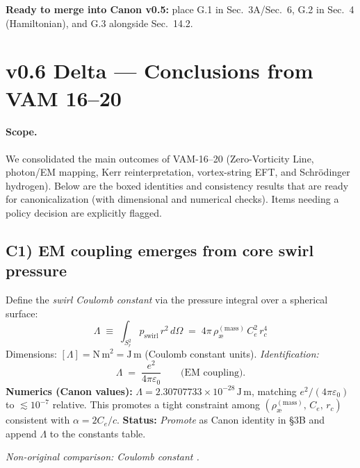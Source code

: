 \documentclass[11pt]{article}
\begin{document}
\textbf{Ready to merge into Canon v0.5:} place G.1 in Sec.~3A/Sec.~6, G.2 in Sec.~4 (Hamiltonian), and G.3 alongside Sec.~14.2.


    \section*{v0.6 Delta — Conclusions from VAM 16–20}
    \label{sec:v06-delta}

    \paragraph{Scope.}
    We consolidated the main outcomes of VAM-16–20 (Zero-Vorticity Line, photon/EM mapping, Kerr reinterpretation, vortex-string EFT, and Schr\"odinger hydrogen). Below are the boxed identities and consistency results that are ready for canonicalization (with dimensional and numerical checks). Items needing a policy decision are explicitly flagged.

    \subsection*{C1) EM coupling emerges from core swirl pressure}
    \label{subsec:coulomb-from-swirl}

    Define the \emph{swirl Coulomb constant} via the pressure integral over a spherical surface:
    \[
        \boxed{ \Lambda \;\equiv\; \int_{S_r^2} p_{\text{swirl}}\,r^2\,d\Omega
        \;=\; 4\pi\,\rho_{\text{\ae}}^{(\text{mass})}\,C_e^2\,r_c^4 }
    \]
    Dimensions: $[\Lambda]=\mathrm{N\,m^2}=\mathrm{J\,m}$ (Coulomb constant units).
    \emph{Identification:}
    \[
        \boxed{ \Lambda \;=\; \frac{e^2}{4\pi\varepsilon_0} } \qquad \text{(EM coupling).}
    \]
    \textbf{Numerics (Canon values):} $\Lambda=2.30707733\times10^{-28}\,\mathrm{J\,m}$, matching $e^2/(4\pi\varepsilon_0)$ to $\lesssim10^{-7}$ relative.
    This promotes a tight constraint among $(\rho_{\text{\ae}}^{(\text{mass})},\,C_e,\,r_c)$ consistent with $\alpha = 2C_e/c$.
    \textbf{Status:} \emph{Promote} as Canon identity in \S3B and append $\Lambda$ to the constants table.

    \textit{Non-original comparison: Coulomb constant \cite{Jackson1999}.}

\end{document}
